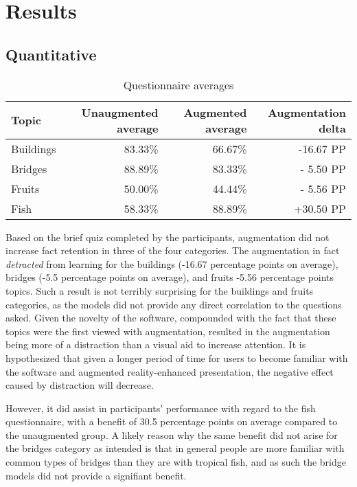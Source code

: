 \documentclass[10pt,journal]{IEEEtran}
\begin{document}
\section{Results}


\subsection{Quantitative}

\begin{table*}[!h]
	\caption{Questionnaire averages}%
	\label{result_averages}
	\centering
	\begin{tabular}{ l | r r | r }
		Topic & Unaugmented average & Augmented average & Augmentation delta \\ \hline
		\hline
		Buildings & 83.33\% & 66.67\% & -16.67 PP \\ \hline
		Bridges & 88.89\% & 83.33\% & - 5.50 PP \\ \hline
		\hline
		Fruits & 50.00\% & 44.44\% & - 5.56 PP \\ \hline
		Fish & 58.33\% & 88.89\% & +30.50 PP \\ \hline
	\end{tabular}
\end{table*}

Based on the brief quiz completed by the participants, augmentation did not
increase fact retention in three of the four categories. The augmentation in
fact \textit{detracted} from learning for the buildings (-16.67 percentage
points on average), bridges (-5.5 percentage points on average), and fruits
{-5.56 percentage points} topics. Such a result is not terribly surprising for
the buildings and fruits categories, as the models did not provide any direct
correlation to the questions asked. Given the novelty of the software,
compounded with the fact that these topics were the first viewed with
augmentation, resulted in the augmentation being more of a distraction than a
visual aid to increase attention. It is hypothesized that given a longer period
of time for users to become familiar with the software and augmented
reality-enhanced presentation, the negative effect caused by distraction will
decrease.

However, it did assist in participants' performance with regard to the fish
questionnaire, with a benefit of 30.5 percentage points on average compared to
the unaugmented group.  A likely reason why the same benefit did not arise for
the bridges category as intended is that in general people are more familiar
with common types of bridges than they are with tropical fish, and as such the
bridge models did not provide a signifiant benefit.
\end{document}
